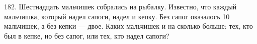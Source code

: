 182. Шестнадцать мальчишек собрались на рыбалку. Известно, что каждый мальчишка, который надел сапоги, надел и кепку. Без сапог оказалось 10 мальчишек, а без кепки --- двое. Каких мальчишек и на сколько больше: тех, кто был в кепке, но без сапог, или тех, кто надел сапоги?\\
